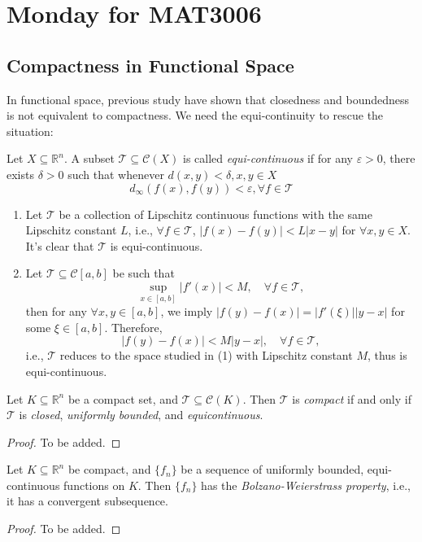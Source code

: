 \section{Monday for MAT3006}

\subsection{Compactness in Functional Space}
In functional space, previous study have shown that closedness and boundedness is not equivalent to compactness. 
We need the equi-continuity to rescue the situation:
\begin{definition}
Let $X\subseteq\mathbb{R}^n$.
A subset $\mathcal{T}\subseteq\mathcal{C}(X)$ is called \emph{equi-continuous} if 
for any $\varepsilon>0$, there exists $\delta>0$ such that whenever $d(x,y)<\delta, x,y\in X$
\[
d_\infty(f(x),f(y))<\varepsilon,\forall f\in\mathcal{T}
\]
\end{definition}
\begin{example}
\begin{enumerate}
\item
Let $\mathcal{T}$ be a collection of Lipschitz continuous functions with the same Lipschitz constant $L$, i.e., $\forall f\in\mathcal{T}$, $|f(x)-f(y)|<L|x-y|$ for $\forall x,y\in X$.
It's clear that $\mathcal{T}$ is equi-continuous.
\item
Let $\mathcal{T}\subseteq\mathcal{C}[a,b]$ be such that
\[
\sup_{x\in[a,b]}|f'(x)|<M,\quad
\forall f\in\mathcal{T},
\]
then for any $\forall x,y\in[a,b]$, we imply $|f(y)-f(x)|=|f'(\xi)||y-x|$ for some $\xi\in[a,b]$. Therefore,
\[
|f(y)-f(x)|<M|y-x|,\quad\forall f\in\mathcal{T},
\]
i.e., $\mathcal{T}$ reduces to the space studied in (1) with Lipschitz constant $M$, thus is equi-continuous.
\end{enumerate}
\end{example}

\begin{theorem}
Let $K\subseteq\mathbb{R}^n$ be a compact set, and $\mathcal{T}\subseteq\mathcal{C}(K)$.
Then $\mathcal{T}$ is \emph{compact} if and only if $\mathcal{T}$ is \emph{closed}, \emph{uniformly bounded}, and \emph{equicontinuous}.
\end{theorem}
\begin{proof}
To be added.
\end{proof}

\begin{corollary}
Let $K\subseteq\mathbb{R}^n$ be compact, and $\{f_n\}$ be a sequence of uniformly bounded, equi-continuous functions on $K$.
Then $\{f_n\}$ has the \emph{Bolzano-Weierstrass property}, i.e.,
it has a convergent subsequence.
\end{corollary}
\begin{proof}
To be added.
\end{proof}
